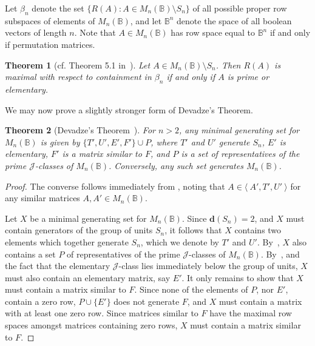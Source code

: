 \documentclass[11pt]{article}
\newtheorem{thm}{Theorem}[subsection]
\numberwithin{equation}{section}
\newcommand{\set}[2]{\ensuremath{\{#1 : #2 \}}}
\newcommand{\genset}[1]{\ensuremath{\langle\: #1 \:\rangle}}
\newcommand{\B}{\mathbb{B}}
\newcommand{\Bn}{M_n(\B)}
\newcommand{\J}{\mathscr{J}}
\begin{document}
Let $\beta_n$ denote the set $\set{R(A)}{A\in \Bn\setminus S_n}$ of all
possible proper row subspaces of elements of $\Bn$, and let $\B^n$ denote
the space of all boolean vectors of length $n$. Note that $A \in \Bn$ has row
space equal to $\B^n$ if and only if permutation matrices.

\begin{thm}[cf. Theorem 5.1 in~\cite{Caen1981aa}]
  Let $A \in \Bn\setminus S_n$. Then $R(A)$ is maximal with respect to
  containment in $\beta_n$ if and only if $A$ is prime or elementary.  
\end{thm}

We may now prove a slightly stronger form of Devadze's Theorem.

\begin{thm}[Devadze's Theorem~\cite{Konieczny2011aa}]
  For $n > 2$, any minimal generating set for $\Bn$ is given by $\{T', U', E',
    F'\} \cup P$, where $T'$ and $U'$ generate $S_n$, $E'$ is elementary, $F'$
  is a matrix similar to $F$, and $P$ is a set of representatives of the prime
  $\J$-classes of $\Bn$. Conversely, any such set generates $\Bn$.
\end{thm}
\begin{proof}
  The converse follows immediately from , noting that $A
  \in \genset{A', T', U'}$ for any similar matrices $A, A' \in \Bn$.

  Let $X$ be a minimal generating set for $\Bn$. Since $\mathbf{d}(S_n) = 2$,
  and $X$ must contain generators of the group of units $S_n$, it follows that
  $X$ contains two elements which together generate $S_n$, which we denote by
  $T'$ and $U'$. By~\cite[Lemma 4.2]{Konieczny2011aa}, $X$ also contains a set
  $P$ of representatives of the prime $\J$-classes of $\Bn$. By~\cite[Lemma
  4.5]{Konieczny2011aa}, and the fact that the elementary $\J$-class lies
  immediately below the group of units, $X$ must also contain an elementary
  matrix, say $E'$. It only remains to show that $X$ must contain a matrix
  similar to $F$. Since none of the elements of $P$, nor $E'$, contain a
  zero row, $P \cup \{E'\}$ does not generate $F$, and $X$ must contain a matrix
  with at least one zero row. Since matrices similar to $F$ have the maximal row
  spaces amongst matrices containing zero rows, $X$ must contain a matrix
  similar to $F$.
\end{proof} 

\end{document}
